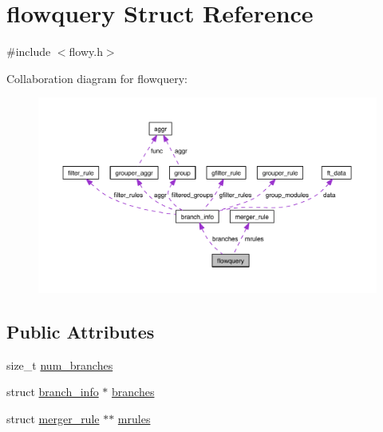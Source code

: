 \hypertarget{structflowquery}{\section{flowquery \-Struct \-Reference}
\label{structflowquery}
}


{\ttfamily \#include $<$flowy.\-h$>$}



\-Collaboration diagram for flowquery\-:
\nopagebreak
\begin{figure}[H]
\begin{center}
\leavevmode
\includegraphics[width=350pt]{structflowquery__coll__graph}
\end{center}
\end{figure}
\subsection*{\-Public \-Attributes}
\begin{DoxyCompactItemize}
\item 
size\-\_\-t \hyperlink{structflowquery_a05bcb67c5382cabaaf3091fe30c2d5cf}{num\-\_\-branches}
\item 
struct \hyperlink{structbranch__info}{branch\-\_\-info} $\ast$ \hyperlink{structflowquery_a52d8a9b01b60859d67a6b5fd3b745f22}{branches}
\item 
struct \hyperlink{structmerger__rule}{merger\-\_\-rule} $\ast$$\ast$ \hyperlink{structflowquery_a0e79fbf4c151b21102191bbd15aa15ea}{mrules}
\end{DoxyCompactItemize}


